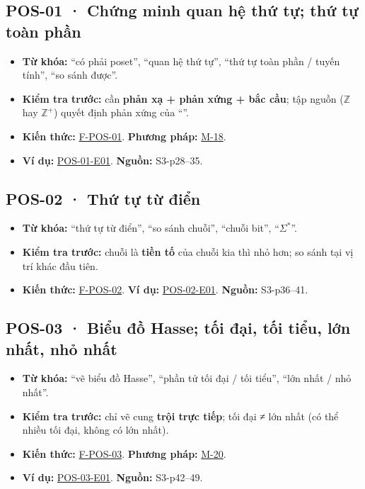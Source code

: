 \documentclass[
  10pt,
  twoside,openany]{book}
\providecommand{\tightlist}{%
  \setlength{\itemsep}{0pt}\setlength{\parskip}{0pt}}
\begin{document}
\hypertarget{POS-01}{%
\subsection{POS-01 · Chứng minh quan hệ thứ tự; thứ tự toàn
phần}\label{POS-01}}

\begin{itemize}
\tightlist
\item
  \textbf{Từ khóa:} ``có phải poset'', ``quan hệ thứ tự'', ``thứ tự toàn
  phần / tuyến tính'', ``so sánh được''.
\item
  \textbf{Kiểm tra trước:} cần \textbf{phản xạ + phản xứng + bắc cầu};
  tập nguồn (\(\mathbb Z\) hay \(\mathbb Z^+\)) quyết định phản xứng của
  ``\textbar{}''.
\item
  \textbf{Kiến thức:} \protect\hyperlink{F-POS-01}{F-POS-01}.
  \textbf{Phương pháp:} \protect\hyperlink{M-18}{M-18}.
\item
  \textbf{Ví dụ:} \protect\hyperlink{POS-01-E01}{POS-01-E01}.
  \textbf{Nguồn:} S3-p28--35.
\end{itemize}

\hypertarget{POS-02}{%
\subsection{POS-02 · Thứ tự từ điển}\label{POS-02}}

\begin{itemize}
\tightlist
\item
  \textbf{Từ khóa:} ``thứ tự từ điển'', ``so sánh chuỗi'', ``chuỗi
  bit'', ``\(\Sigma^*\)''.
\item
  \textbf{Kiểm tra trước:} chuỗi là \textbf{tiền tố} của chuỗi kia thì
  nhỏ hơn; so sánh tại vị trí khác đầu tiên.
\item
  \textbf{Kiến thức:} \protect\hyperlink{F-POS-02}{F-POS-02}. \textbf{Ví
  dụ:} \protect\hyperlink{POS-02-E01}{POS-02-E01}. \textbf{Nguồn:}
  S3-p36--41.
\end{itemize}

\hypertarget{POS-03}{%
\subsection{POS-03 · Biểu đồ Hasse; tối đại, tối tiểu, lớn nhất, nhỏ
nhất}\label{POS-03}}

\begin{itemize}
\tightlist
\item
  \textbf{Từ khóa:} ``vẽ biểu đồ Hasse'', ``phần tử tối đại / tối
  tiểu'', ``lớn nhất / nhỏ nhất''.
\item
  \textbf{Kiểm tra trước:} chỉ vẽ cung \textbf{trội trực tiếp}; tối đại
  ≠ lớn nhất (có thể nhiều tối đại, không có lớn nhất).
\item
  \textbf{Kiến thức:} \protect\hyperlink{F-POS-03}{F-POS-03}.
  \textbf{Phương pháp:} \protect\hyperlink{M-20}{M-20}.
\item
  \textbf{Ví dụ:} \protect\hyperlink{POS-03-E01}{POS-03-E01}.
  \textbf{Nguồn:} S3-p42--49.
\end{itemize}
\end{document}

